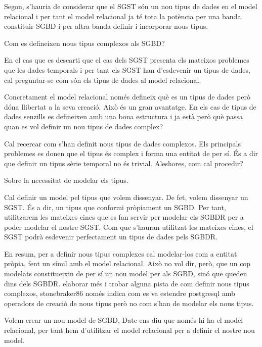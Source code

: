 Segon, s'hauria de considerar que el SGST són un nou tipus de dades en el model relacional i per tant el model relacional ja té tota la potència per una banda constituir SGBD i per altra banda definir i incorporar nous tipus.


Com es defineixen nous tipus complexos als SGBD?

En el cas que es descarti que el cas dels SGST presenta els mateixos problemes que les dades temporals i per tant els SGST han d'esdevenir un tipus de dades, cal preguntar-se com són els tipus de dades al model relacional.

Concretament el model relacional només defineix què es un tipus de dades però dóna llibertat a la seva creació. Això és un gran avantatge. En els cas de tipus de dades senzills es defineixen amb una bona estructura i ja està però què passa quan es vol definir un nou tipus de dades complex?

Cal recercar com s'han definit nous tipus de dades complexos. Els principals problemes es donen que el tipus és complex i forma una entitat de per sí. És a dir que definir un tipus sèrie temporal no és trivial. Aleshores, com cal procedir?



Sobre la necessitat de modelar els tipus.

Cal definir un model pel tipus que volem dissenyar.
De fet, volem dissenyar un SGST. És a dir, un tipus que conformi pròpiament un SGBD. Per tant, utilitzarem les mateixes eines que es fan servir per modelar els SGBDR per a poder modelar el nostre SGST. Com que s'hauran utilitzat les mateixes eines, el SGST podrà esdevenir perfectament un tipus de dades pels SGBDR.

En resum, per a definir nous tipus complexes cal modelar-los com a entitat pròpia, fent un símil amb el model relacional. Això no vol dir, però, que un cop modelats constitueixin de per sí un nou model per als SGBD, sinó que queden dins dels SGBDR.  elaborar més i trobar alguna pista de com definir nous tipus complexos, stonebraker86 només indica com es va estendre postgresql amb operadors de creació de nous tipus però no com s'han de modelar els nous tipus.

Volem crear un nou model de SGBD, Date ens diu que només hi ha el model relacional, per tant hem d'utilitzar el model relacional per a definir el nostre nou model.





